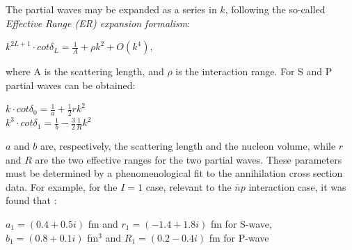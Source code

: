 The partial waves may be expanded as a series in $k$, following the so-called \emph{Effective Range (ER) expansion formalism}:
\begin{center}
$k^{2L+1} \cdot cot\delta_L = \frac{1}{A} + \rho k^2 + O(k^4)$,
\end{center}
where A is the scattering length, and $\rho$ is the interaction range. For S and P partial waves can be obtained:
\begin{center}
$k \cdot cot\delta_0 = \frac{1}{a} + \frac{1}{2} r k^2$ \\
\vspace{0.3cm}
$k^3 \cdot cot\delta_1 = \frac{1}{b} - \frac{3}{2} \frac{1}{R} k^2$
\end{center}
$a$ and $b$ are, respectively, the scattering length and the nucleon volume, while $r$ and $R$ are the two effective ranges for the two partial waves. These parameters must be determined by a phenomenological fit to the annihilation cross section data. For example, for the $I=1$ case, relevant to the $\bar{n}p$ interaction case, it was found that \cite{bertin1997}:
\begin{center}
$a_1 = (0.4 + 0.5 i)$ fm and $r_1 = (-1.4 + 1.8 i)$ fm for S-wave, \\
\vspace{0.3cm}
$b_1 = (0.8 + 0.1i)$ fm$^3$ and $R_1 = (0.2 - 0.4 i)$ fm for P-wave
\end{center}

